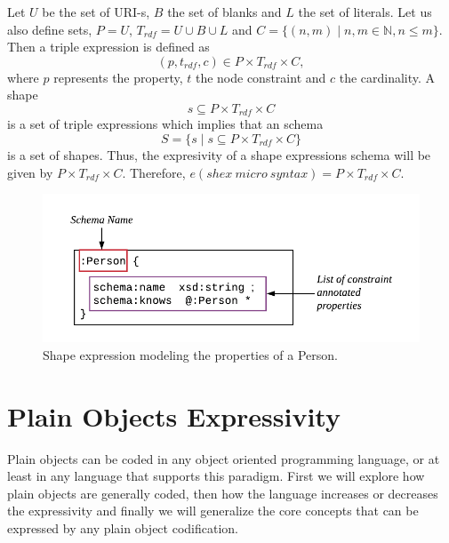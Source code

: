 Let $U$ be the set of URI-s, $B$ the set of blanks and $L$ the set of literals.
Let us also define sets, $P=U$, $T_{rdf} = U \cup B \cup L$ and $C = \{ (n,m) \mid n,m \in \mathbb{N}, n\leq m\}$.
Then a triple expression is defined as
\begin{equation}
(p,t_{rdf},c) \in P \times T_{rdf} \times C,
\end{equation}
where $p$ represents the property, $t$ the node constraint and $c$ the cardinality. A shape
\begin{equation}
s \subseteq P \times T_{rdf} \times C
\end{equation}
is a set of triple expressions which implies that an schema
\begin{equation}\label{eq:exp-shape}
S=\{s \mid s \subseteq P \times T_{rdf} \times C\}
\end{equation}
is a set of shapes. Thus, the expresivity of a shape expressions schema will be given by $P \times T_{rdf} \times C$.
Therefore, $e(shex\ micro\ syntax) = P \times T_{rdf} \times C$.

\begin{figure}
    \includegraphics[scale=0.7]{images/shex-example-parts.pdf}
    \centering
    \caption[Shape expression modeling the properties of a Person]{Shape expression modeling the properties of a Person.}
    \label{fig:prop-def-shape-diagram}
\end{figure}



\section{Plain Objects Expressivity}\label{sec:poe}
Plain objects can be coded in any object oriented programming language, or at least in
any language that supports this paradigm. First we will explore how plain objects are 
generally coded, then how the language increases or decreases the expressivity and
finally we will generalize the core concepts that can be expressed by any plain object
codification.

